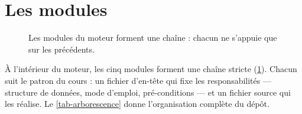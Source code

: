 \section{Les modules}

\begin{figure}[ht]
    \centering
    \caption{Les modules du moteur forment une chaîne : chacun ne s'appuie que sur les
        précédents.}
    \label{fig-modules}
\end{figure}

À l'intérieur du moteur, les cinq modules forment une chaîne stricte (\cref{fig-modules}).
Chacun suit le patron du cours : un fichier d'en-tête qui fixe les responsabilités ---
structure de données, mode d'emploi, pré-conditions --- et un fichier source qui les réalise. Le \cref{tab-arborescence} donne l'organisation complète du dépôt.


